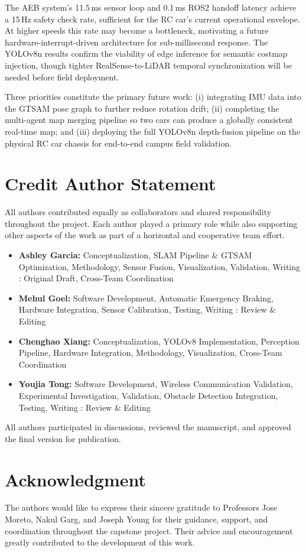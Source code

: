 \documentclass[journal,transmag]{IEEEtran}
\begin{document}
The AEB system's 11.5\,ms sensor loop and 0.1\,ms ROS2 handoff latency achieve a 15\,Hz safety check rate, sufficient for the RC car's current operational envelope. At higher speeds this rate may become a bottleneck, motivating a future hardware-interrupt-driven architecture for sub-millisecond response. The YOLOv8n results confirm the viability of edge inference for semantic costmap injection, though tighter RealSense-to-LiDAR temporal synchronization will be needed before field deployment.
 
Three priorities constitute the primary future work: (i) integrating IMU data into the GTSAM pose graph to further reduce rotation drift; (ii) completing the multi-agent map merging pipeline so two cars can produce a globally consistent real-time map; and (iii) deploying the full YOLOv8n depth-fusion pipeline on the physical RC car chassis for end-to-end campus field validation.

\section*{Credit Author Statement}
\small
All authors contributed equally as collaborators and shared responsibility throughout the project.  
Each author played a primary role while also supporting other aspects of the work as part of a horizontal and cooperative team effort.

\begin{itemize}
    \item \textbf{Ashley Garcia:} Conceptualization, SLAM Pipeline \& GTSAM Optimization, Methodology, Sensor Fusion, Visualization, Validation, Writing : Original Draft, Cross-Team Coordination
    \item \textbf{Mehul Goel:} Software Development, Automatic Emergency Braking, Hardware Integration, Sensor Calibration, Testing, Writing : Review \& Editing  
    \item \textbf{Chenghao Xiang:} Conceptualization, YOLOv8 Implementation, Perception Pipeline, Hardware Integration, Methodology, Visualization, Cross-Team Coordination
    \item \textbf{Youjia Tong:} Software Development, Wireless Communication Validation, Experimental Investigation, Validation, Obstacle Detection Integration, Testing, Writing : Review \& Editing 
\end{itemize}

All authors participated in discussions, reviewed the manuscript, and approved the final version for publication.

\normalsize

\section*{Acknowledgment}
\small
The authors would like to express their sincere gratitude to Professors Jose Moreto, Nakul Garg, and Joseph Young for their guidance, support, and coordination throughout the capstone project. Their advice and encouragement greatly contributed to the development of this work.



\end{document}
